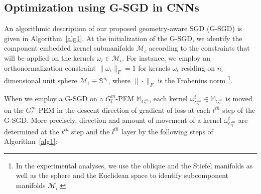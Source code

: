 \documentclass[10pt,journal,compsoc]{IEEEtran}
\theoremstyle{definition}
\theoremstyle{definition}
\theoremstyle{remark}
\theoremstyle{remark}
\theoremstyle{remark}
\begin{document}
\subsection{Optimization using G-SGD in CNNs}

An algorithmic description of our proposed geometry-aware SGD (G-SGD) is given in Algorithm~\ref{alg1}. At the initialization of the G-SGD, we identify the component embedded kernel submanifolds $\mathcal{M}_{\iota}$ according to the constraints that will be applied on the kernels $\omega_{\iota} \in \mathcal{M}_{\iota}$. For instance, we employ an orthonormalization constraint $\| \omega_{\iota} \|_F = 1$ for kernels $\omega_{\iota}$ residing on $n_{\iota}$ dimensional unit sphere $\mathcal{M}_{\iota} \equiv \mathbb{S}^{n_{\iota}}$, where $\| \cdot \| _F$ is the Frobenius norm \cite{manopt_book}\footnote{In the experimental analyses, we use the oblique and the Stiefel manifolds as well as the sphere and the Euclidean space to identify subcomponent manifolds $\mathcal{M}_{\iota}$.}. 

When we employ a G-SGD on a $G^m_l$-PEM $\mathbb{M}_{G^m_l}$, each kernel $\omega_{G^m_l}^t \in \mathbb{M}_{G^m_l}$ is moved on the $G^m_l$-PEM in the descent direction of gradient of loss at each $t^{th}$ step of the G-SGD. More precisely, direction and amount of movement of a kernel $\omega^t_{G^m_l}$ are determined at the $t^{th}$ step and the $l^{th}$ layer by the following steps of Algorithm~\ref{alg1}:
\end{document}
